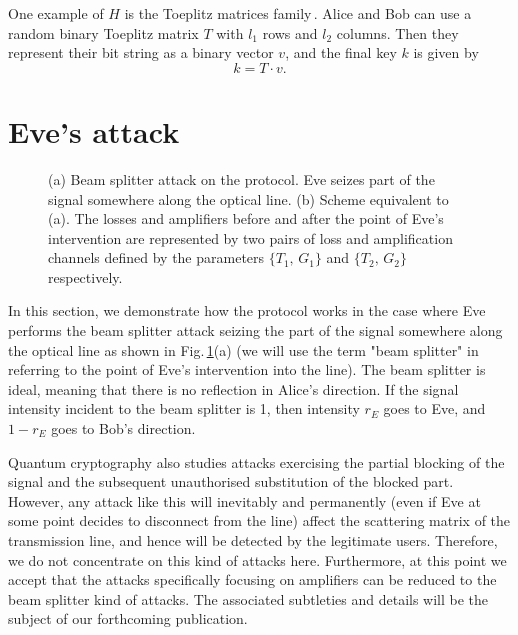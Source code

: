 \documentclass[a4paper]{article}
\begin{document}
One example of $H$ is the Toeplitz matrices family\,\cite{krawczyk_Toeplitz}. 
Alice and Bob can use a random binary Toeplitz matrix $T$ with $l_1$ rows and $l_2$ columns. 
Then they represent their bit string as a binary vector $v$, and the final key $k$ is given by
$$k = T\cdot v.$$

\section{Eve's attack}
%
\begin{figure}[t]
    \noindent{}
    \caption{
    (a) Beam splitter attack on the protocol. 
    Eve seizes part of the signal somewhere along the optical line.
    (b) Scheme equivalent to (a). 
    The losses and amplifiers before and after the point of Eve's intervention are represented by two pairs of loss and amplification channels defined by the parameters $\{T_1,\,G_1\}$ and $\{T_2,\,G_2\}$ respectively.
    } 
    \label{Fig5}
\end{figure}
%
In this section, we demonstrate how the protocol works in the case where Eve performs the beam splitter attack seizing the part of the signal somewhere along the optical line as shown in Fig.\,\ref{Fig5}(a) (we will use the term "beam splitter" in referring to the point of Eve's intervention into the line).
The beam splitter is ideal, meaning that there is no reflection in Alice's direction. 
If the signal intensity incident to the beam splitter is 1, then intensity $r_E$ goes to Eve, and $1-r_E$ goes to Bob's direction.

Quantum cryptography also studies attacks exercising the partial blocking of the signal and the subsequent unauthorised substitution of the blocked part.
However, any attack like this will inevitably and permanently (even if Eve at some point decides to disconnect from the line) affect the scattering matrix of the transmission line, and hence will be detected by the legitimate users.  
Therefore, we do not concentrate on this kind of attacks here.
Furthermore, at this point we accept that the attacks specifically focusing on amplifiers can be reduced to the beam splitter kind of attacks. The associated subtleties and details will be the subject of our forthcoming publication.
\end{document}
